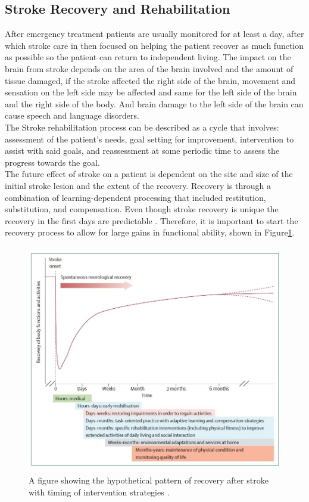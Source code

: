 \subsection{Stroke Recovery and Rehabilitation}
After emergency treatment patients are usually monitored for at least a day, after which stroke care in then focused on helping the patient recover as much function as possible so the patient can return to independent living. The impact on the brain from stroke depends on the area of the brain involved and the amount of tissue damaged, if the stroke affected the right side of the brain, movement and sensation on the left side may be affected and same for the left side of the brain and the right side of the body. And brain damage to the left side of the brain can cause speech and language disorders. \\
The Stroke rehabilitation process can be described as a cycle that involves: assessment of the patient’s needs, goal setting for improvement, intervention to assist with said goals, and reassessment at some periodic time to assess the progress towards the goal. \cite{mayostroke,eggers1984occupational}\\
The future effect of stroke on a patient is dependent on the site and size of the initial stroke lesion and the extent of the recovery. Recovery is through a combination of learning-dependent processing that included restitution, substitution, and compensation. Even though stroke recovery is unique the recovery in the first days are predictable \cite{Langhorne2011a}. Therefore, it is important to start the recovery process to allow for large gains in functional ability, shown in Figure\ref{fig:recovery}.

\begin{figure}[p]%
	\centering
	\includegraphics[width=14cm,height=10cm]{figures/ch2/recpattern}
	\caption{A figure showing the hypothetical pattern of recovery after stroke with timing of intervention strategies \cite{Langhorne2011a}.}
	\label{fig:recovery}
\end{figure}
\newpage
